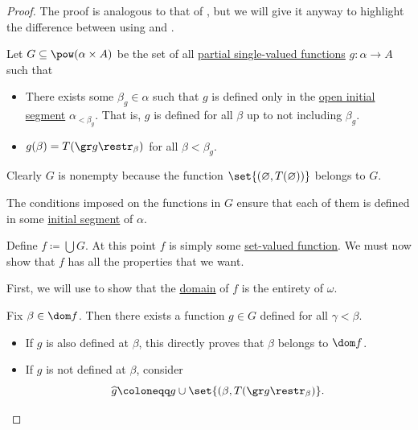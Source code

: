 \begin{proof}
  The proof is analogous to that of , but we will give it anyway to highlight the difference between using  and .

  Let \( G \subseteq \pow(\alpha \times A) \) be the set of all \hyperref[def:partial_function]{partial single-valued functions} \( g: \alpha \to A \) such that
  \begin{itemize}
    \item There exists some \( \beta_g \in \alpha \) such that \( g \) is defined only in the \hyperref[def:order_interval/unbounded]{open initial segment} \( \alpha_{< \beta_g} \). That is, \( g \) is defined for all \( \beta \) up to not including \( \beta_g \).

    \item \( g(\beta) = T(\gr g\restr_\beta) \) for all \( \beta < \beta_g \).
  \end{itemize}

  Clearly \( G \) is nonempty because the function \( \set{ (\varnothing, T(\varnothing)) } \) belongs to \( G \).

  The conditions imposed on the functions in \( G \) ensure that each of them is defined in some \hyperref[def:order_interval/unbounded]{initial segment} of \( \alpha \).

  Define \( f \coloneqq \bigcup G \). At this point \( f \) is simply some \hyperref[def:function]{set-valued function}. We must now show that \( f \) has all the properties that we want.

   First, we will use  to show that the \hyperref[def:set_valued_function/domain]{domain} of \( f \) is the entirety of \( \omega \).

  Fix \( \beta \in \dom f \). Then there exists a function \( g \in G \) defined for all \( \gamma < \beta \).

  \begin{itemize}
    \item If \( g \) is also defined at \( \beta \), this directly proves that \( \beta \) belongs to \( \dom f \).

    \item If \( g \) is not defined at \( \beta \), consider
    \begin{equation*}
      \widehat g \coloneqq g \cup \set{ (\beta, T(\gr g\restr_\beta) }.
    \end{equation*}


\end{itemize}
\end{proof}
